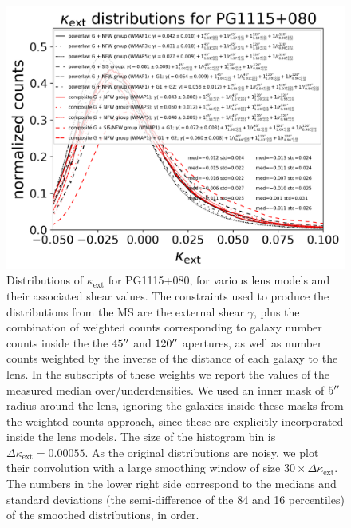 \documentclass[useAMS,usenatbib]{mnras}
\begin{document}
\begin{figure}
\includegraphics[width=\linewidth]{kappahistPG1115Chih-Fan.png}
\caption{Distributions of $\kappa_\mathrm{ext}$ for PG1115+080, for various lens models and their associated shear values. The constraints used to produce the distributions from the MS are the external shear $\gamma$, plus the combination of weighted counts corresponding to galaxy number counts inside the the $45\hbox{$^{\prime\prime}$}$ and $120\hbox{$^{\prime\prime}$}$ apertures, as well as number counts weighted by the inverse of the distance of each galaxy to the lens. In the subscripts of these weights we report the values of the measured median over/underdensities. We used an inner mask of $5\hbox{$^{\prime\prime}$}$ radius around the lens, ignoring the galaxies inside these masks from the weighted counts approach, since these are explicitly incorporated inside the lens models. The size of the histogram bin is $\Delta\kappa_\mathrm{ext}=0.00055$. As the original distributions are noisy, we plot their convolution with a large smoothing window of size $30\times\Delta\kappa_\mathrm{ext}$. The numbers in the lower right side correspond to the medians and standard deviations (the semi-difference of the 84 and 16 percentiles) of the smoothed distributions, in order.}
\label{fig:kappaPG1115}
\end{figure}
\end{document}
